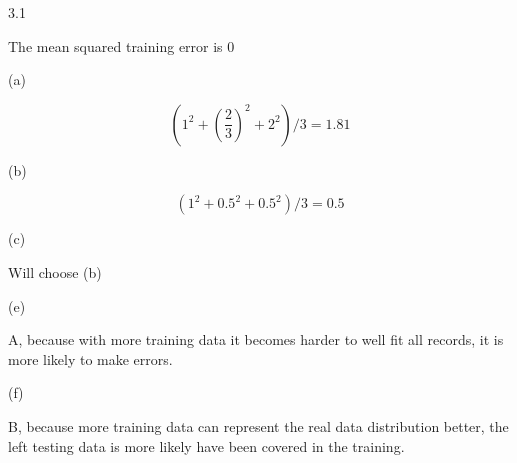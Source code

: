 \documentclass[11pt]{article}
\begin{document}
\begin{enumerate}
3.1

The mean squared training error is $0$


(a)

$$ (1^2 + (\frac{2}{3})^2 + 2^2) / 3 = 1.81 $$

(b)

$$ (1^2 + 0.5^2 + 0.5^2) / 3 = 0.5 $$

(c)

Will choose (b)


(e)

A, because with more training data it becomes harder to well fit all records, it is more likely to make errors.

(f)

B, because more training data can represent the real data distribution better, the left testing data is more likely have been covered in the training.



\end{enumerate}
\end{document}
